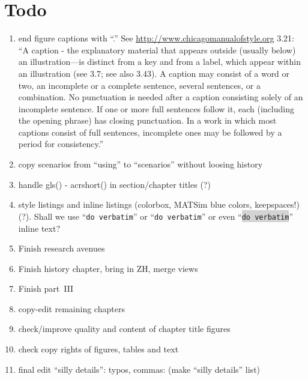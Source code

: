 \section*{Todo}

\begin{enumerate}\styleEnumerate

\item end figure captions with ``.'' See \url{http://www.chicagomanualofstyle.org} 3.21: ``A caption - the explanatory material that appears outside (usually below) an illustration—is distinct from a key and from a label, which appear within an illustration (see 3.7; see also 3.43). A caption may consist of a word or two, an incomplete or a complete sentence, several sentences, or a combination. No punctuation is needed after a caption consisting solely of an incomplete sentence. If one or more full sentences follow it, each (including the opening phrase) has closing punctuation. In a work in which most captions consist of full sentences, incomplete ones may be followed by a period for consistency.''

\item copy scenarios from ``using'' to ``scenarios'' without loosing history

\item handle gls() - acrshort() in section/chapter titles (?)

\item style listings and inline listings (colorbox, MATSim blue colors, keepspaces!) (?). Shall we use ``\verb|do verbatim|'' or ``\lstinline|do verbatim|'' or even ``\colorbox{lightgray}{\lstinline|do verbatim|}'' inline text?

\item Finish research avenues

\item Finish history chapter, bring in ZH, merge views

\item Finish part~III

\item copy-edit remaining chapters

\item check/improve quality and content of chapter title figures

\item check copy rights of figures, tables and text

\item final edit ``silly details'': typos, commas: (make ``silly details'' list)


\end{enumerate}
